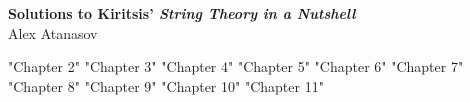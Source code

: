 \documentclass[11pt]{article}
\begin{document}
	\begin{center}
		\Large \textbf{Solutions to Kiritsis' \emph{String Theory in a Nutshell}}\\
		Alex Atanasov
	\end{center}
	
	{"Chapter 2"}
	\newpage 
	{"Chapter 3"}
	\newpage 
	{"Chapter 4"}
	\newpage 
	{"Chapter 5"}
	\newpage 
	{"Chapter 6"}
	\newpage 
	{"Chapter 7"}
	\newpage 
	{"Chapter 8"}
	\newpage 
	{"Chapter 9"}
	\newpage 
	{"Chapter 10"}
	\newpage 
	{"Chapter 11"}
\end{document}
